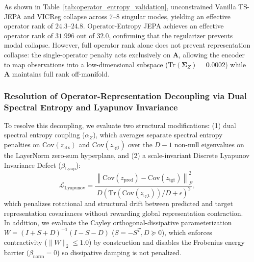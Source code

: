 As shown in Table~\ref{tab:operator_entropy_validation}, unconstrained Vanilla TS-JEPA and VICReg collapse across $7\text{--}8$ singular modes, yielding an effective operator rank of $24.3\text{--}24.8$. Operator-Entropy JEPA achieves an effective operator rank of $31.996$ out of $32.0$, confirming that the regularizer prevents modal collapse. However, full operator rank alone does not prevent representation collapse: the single-operator penalty acts exclusively on $\mathbf{A}$, allowing the encoder to map observations into a low-dimensional subspace ($\text{Tr}(\mathbf{\Sigma}_Z) = 0.0002$) while $\mathbf{A}$ maintains full rank off-manifold.

\subsubsection{Resolution of Operator-Representation Decoupling via Dual Spectral Entropy and Lyapunov Invariance}
\label{sup:opentropy_ablation}

To resolve this decoupling, we evaluate two structural modifications: (1) dual spectral entropy coupling ($\alpha_Z$), which averages separate spectral entropy penalties on $\mathrm{Cov}(z_{\text{ctx}})$ and $\mathrm{Cov}(z_{\text{tgt}})$ over the $D-1$ non-null eigenvalues on the LayerNorm zero-sum hyperplane, and (2) a scale-invariant Discrete Lyapunov Invariance Defect ($\beta_{\text{Lyap}}$):
\begin{equation}
    \mathcal{L}_{\text{Lyapunov}} = \frac{\left\| \mathrm{Cov}(z_{\text{pred}}) - \mathrm{Cov}(z_{\text{tgt}}) \right\|_F^2}{D \left(\mathrm{Tr}(\mathrm{Cov}(z_{\text{tgt}}))/D + \epsilon\right)^2},
\end{equation}
which penalizes rotational and structural drift between predicted and target representation covariances without rewarding global representation contraction. In addition, we evaluate the Cayley orthogonal-dissipative parameterization $W = (I + S + D)^{-1}(I - S - D)$ ($S = -S^T, D \succeq 0$), which enforces contractivity ($\|W\|_2 \le 1.0$) by construction and disables the Frobenius energy barrier ($\beta_{\text{norm}} = 0$) so dissipative damping is not penalized.


